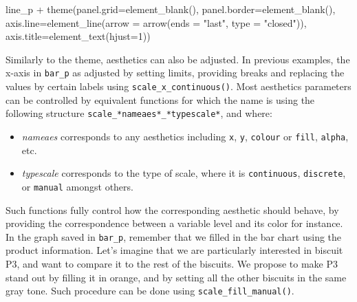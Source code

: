 \documentclass[
]{book}
\newenvironment{Shaded}{\begin{snugshade}}{\end{snugshade}}
\newcommand{\AttributeTok}[1]{\textcolor[rgb]{0.77,0.63,0.00}{#1}}
\newcommand{\DecValTok}[1]{\textcolor[rgb]{0.00,0.00,0.81}{#1}}
\newcommand{\FunctionTok}[1]{\textcolor[rgb]{0.00,0.00,0.00}{#1}}
\newcommand{\NormalTok}[1]{#1}
\newcommand{\SpecialCharTok}[1]{\textcolor[rgb]{0.00,0.00,0.00}{#1}}
\newcommand{\StringTok}[1]{\textcolor[rgb]{0.31,0.60,0.02}{#1}}
\providecommand{\tightlist}{%
  \setlength{\itemsep}{0pt}\setlength{\parskip}{0pt}}
\begin{document}
\begin{Shaded}
\begin{Highlighting}[]
\NormalTok{line\_p }\SpecialCharTok{+}
  \FunctionTok{theme}\NormalTok{(}\AttributeTok{panel.grid=}\FunctionTok{element\_blank}\NormalTok{(), }
        \AttributeTok{panel.border=}\FunctionTok{element\_blank}\NormalTok{(),}
        \AttributeTok{axis.line=}\FunctionTok{element\_line}\NormalTok{(}\AttributeTok{arrow =} \FunctionTok{arrow}\NormalTok{(}\AttributeTok{ends =} \StringTok{"last"}\NormalTok{, }\AttributeTok{type =} \StringTok{"closed"}\NormalTok{)),}
        \AttributeTok{axis.title=}\FunctionTok{element\_text}\NormalTok{(}\AttributeTok{hjust=}\DecValTok{1}\NormalTok{))}
\end{Highlighting}
\end{Shaded}

Similarly to the theme, aesthetics can also be adjusted. In previous examples, the x-axis in \texttt{bar\_p} as adjusted by setting limits, providing breaks and replacing the values by certain labels using \texttt{scale\_x\_continuous()}.
Most aesthetics parameters can be controlled by equivalent functions for which the name is using the following structure \texttt{scale\_*nameaes*\_*typescale*}, and where:

\begin{itemize}
\tightlist
\item
  \emph{nameaes} corresponds to any aesthetics including \texttt{x}, \texttt{y}, \texttt{colour} or \texttt{fill}, \texttt{alpha}, etc.
\item
  \emph{typescale} corresponds to the type of scale, where it is \texttt{continuous}, \texttt{discrete}, or \texttt{manual} amongst others.
\end{itemize}

Such functions fully control how the corresponding aesthetic should behave, by providing the correspondence between a variable level and its color for instance. In the graph saved in \texttt{bar\_p}, remember that we filled in the bar chart using the product information. Let's imagine that we are particularly interested in biscuit P3, and want to compare it to the rest of the biscuits. We propose to make P3 stand out by filling it in orange, and by setting all the other biscuits in the same gray tone.
Such procedure can be done using \texttt{scale\_fill\_manual()}.
\end{document}
